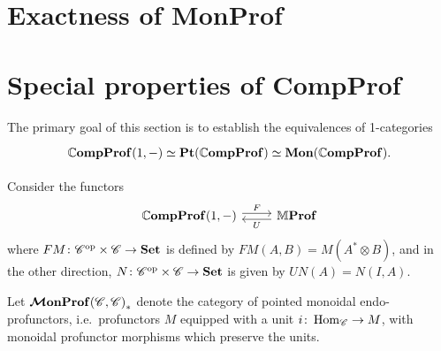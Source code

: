 \documentclass[12pt,oneside,article,draft]{memoir}
\begin{document}
\section{Exactness of MonProf}

\section{Special properties of CompProf}

The primary goal of this section is to establish the equivalences of 1-categories
\begin{equation}\label{eqn:primary goal}
   \begin{tikzcd}
      \dCompProf(1,-) \equiv \Pt(\dCompProf) \equiv \Mon(\dCompProf).
   \end{tikzcd}
\end{equation}

Consider the functors
\begin{equation}\label{eqn:functors 1C CC}
\begin{tikzcd}
   \dCompProf(1,-) \ar[r,shift left,"F"]
   & \dMProf \ar[l,shift left,"U"]
\end{tikzcd}
\end{equation}
where $FM\colon{\mathscr{C}}^{\text{op}}\times\mathscr{C}\to\mathbf{Set}$ is defined by $FM(A,B)=M(A^*\otimes B)$, and in the
other direction, $N\colon{\mathscr{C}}^{\text{op}}\times\mathscr{C}\to\mathbf{Set}$ is given by $UN(A)=N(I,A)$.

Let $\bm{\mathcal{M}}\mathbf{onProf}{(\mathscr{C},\mathscr{C})}_{\ast}$ denote the category of pointed monoidal endo-profunctors,
i.e.~profunctors $M$ equipped with a unit $i\colon\operatorname{Hom}_{\mathscr{C}}\to M$, with monoidal profunctor
morphisms which preserve the units.
\end{document}

